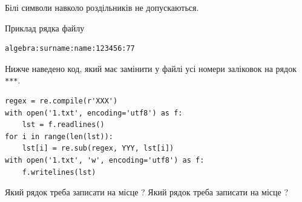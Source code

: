 \documentclass[12pt, ukrainian]{article}
\def\code#1{\Verb!#1!}
\begin{document}
{Білі символи навколо роздільників не допускаються.

Приклад рядка файлу



\begin{verbatim}
algebra:surname:name:123456:77
\end{verbatim}


Нижче наведено код, який має замінити у файлі усі номери заліковок на рядок \code{***}.



\begin{verbatim}
regex = re.compile(r'XXX')
with open('1.txt', encoding='utf8') as f:
    lst = f.readlines()
for i in range(len(lst)):
    lst[i] = re.sub(regex, YYY, lst[i])
with open('1.txt', 'w', encoding='utf8') as f:
    f.writelines(lst)
\end{verbatim}





Який рядок треба записати на місце  ?
Який рядок треба записати на місце  ?\par

}
\newpage
\end{document}
